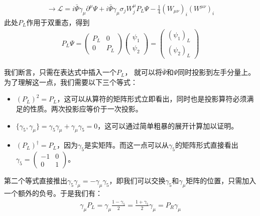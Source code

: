 \begin{align}
\rightarrow\mathscr{L}=i\bar{\Psi}\gamma_\mu\partial^\mu\Psi+i\bar{\Psi}\gamma_\mu\sigma_j W_j^\mu P_L\Psi-\frac{1}{4}(W_{\mu\nu})_i(W^{\mu\nu})_i
\label{equ7.105}
\end{align}
此处$P_L$作用于双重态，得到
\begin{align}
P_L\Psi=\begin{pmatrix}P_L & 0 \\ 0 & P_L\end{pmatrix}\begin{pmatrix}\psi_1\\\psi_2\end{pmatrix}=\begin{pmatrix}(\psi_1)_L\\(\psi_2)_L\end{pmatrix}
\label{equ7.106}
\end{align}

我们断言，只需在表达式中插入一个$P_L$， 就可以将$\bar{\Psi}$和$\Psi$同时投影到左手分量上。为了理解这一点，我们需要以下三个等式：
\begin{itemize}
\item $(P_L)^2 = P_L$，这可以从算符的矩阵形式立即看出，同时也是投影算符必须满足的性质。两次投影应等价于一次投影。
\item $\{\gamma_5,\gamma_\mu\}=\gamma_5\gamma_\mu+\gamma_\mu\gamma_5=0$，这可以通过简单粗暴的展开计算加以证明。
\item $(P_L)^\dag=P_L$，因为$\gamma_5$是实矩阵。而这一点可以从$\gamma_5$的矩阵形式直接看出$\gamma_5=\begin{pmatrix}-1 & 0 \\ 0 & 1\end{pmatrix}$。

\end{itemize}

第二个等式直接推出$\gamma_5\gamma_\mu=-\gamma_\mu\gamma_5$，即我们可以交换$\gamma_5$和$\gamma_\mu$矩阵的位置，只需加入一个额外的负号。于是我们有：
\begin{align}
\gamma_\mu P_L=\gamma_\mu\frac{1-\gamma_5}{2}=\frac{1+\gamma_5}{2}\gamma_\mu=P_R\gamma_\mu
\label{equ7.107}
\end{align}

